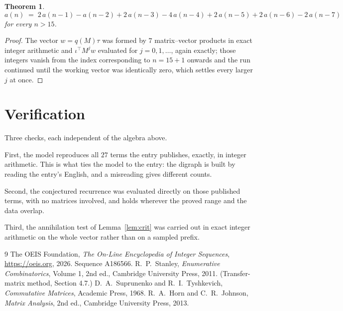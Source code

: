 \documentclass[11pt,a4paper]{article}
\theoremstyle{plain}
\newtheorem{theorem}{Theorem}
\theoremstyle{definition}
\begin{document}
\begin{theorem}
\[
a(n)\;=\;2\,a(n-1) - a(n-2) + 2\,a(n-3) - 4\,a(n-4) + 2\,a(n-5) + 2\,a(n-6) - 2\,a(n-7)
\]
for every $n>15$.
\end{theorem}

\begin{proof}
The vector $w=q(M)\tau$ was formed by $7$ matrix--vector products in exact integer
arithmetic and $\iota^{\!\top}M^{j}w$ evaluated for $j=0,1,\dots$, again exactly; those
integers vanish from the index corresponding to $n=15+1$ onwards and the run continued
until the working vector was identically zero, which settles every larger $j$ at once.
\end{proof}

\section{Verification}

Three checks, each independent of the algebra above.

First, the model reproduces all $27$ terms the entry publishes, exactly, in integer
arithmetic. This is what ties the model to the entry: the digraph is built by reading the
entry's English, and a misreading gives different counts.

Second, the conjectured recurrence was evaluated directly on those published terms, with no
matrices involved, and holds wherever the proved range and the data overlap.

Third, the annihilation test of Lemma~\ref{lem:crit} was carried out in exact integer
arithmetic on the whole vector rather than on a sampled prefix.

\begin{thebibliography}{9}
 The OEIS Foundation, \emph{The On-Line Encyclopedia of Integer
Sequences}, \url{https://oeis.org}, 2026. Sequence A186566.
 R.~P.~Stanley, \emph{Enumerative Combinatorics}, Volume 1, 2nd ed.,
Cambridge University Press, 2011. (Transfer-matrix method, Section 4.7.)
 D.~A.~Suprunenko and R.~I.~Tyshkevich, \emph{Commutative Matrices},
Academic Press, 1968.
 R.~A.~Horn and C.~R.~Johnson, \emph{Matrix Analysis}, 2nd ed., Cambridge
University Press, 2013.
\end{thebibliography}
\end{document}

